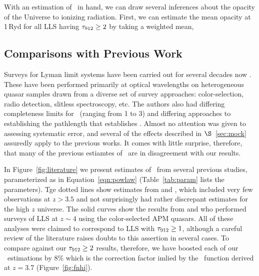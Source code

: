 \documentclass[12pt,preprint]{aastex}
\begin{document}
With an estimation of \lfnhi\ in hand, we can draw several inferences
about the opacity of the Universe to ionizing radiation.  First,
we can estimate the mean opacity at 1\,Ryd for all LLS having $\tau_{\rm 912} \ge 2$
by taking a weighted mean,


\subsection{Comparisons with Previous Work}

Surveys for Lyman limit systems have been carried out for several
decades now \citep{tytler84,ssb89,lzt93,sl95,sl96,peroux03}.
These have been  performed primarily at optical wavelengths on 
heterogeneous quasar samples drawn from a diverse set of
survey approaches: color-selection, radio detection, slitless
spectroscopy, etc.  The authors also had differing completeness
limits for \tll\ (ranging from 1 to 3) and differing approaches
to establishing the pathlength that establishes \lzlls.  Almost
no attention was given to assessing systematic error, and several
of the effects described in $\S$~\ref{sec:mock} assuredly apply
to the previous works.  It comes with little surprise, therefore,
that many of the previous estiamtes of \lzlls\ are in disagreement
with our results.

In Figure~\ref{fig:literature} we present estimates of \lzlls\
from several previous studies, parameterized as in Equation~\ref{eqn:powlaw}
(Table~\ref{tab:param} lists the parameters).  
Tge dotted lines show estimates from \cite{ssb89} and \cite{lzt91},
which included very few observations at $z>3.5$ and not surprisingly 
had rather discrepant estimates for the high $z$ universe.
The solid curves show the results from \cite{sl94} and \cite{peroux03}
who performed surveys of LLS at $z \sim 4$ using the color-selected
APM quasars.  All of these analyses were claimed to correspond to 
LLS with $\tau_{\rm 912} \ge 1$, although a careful review of the literature
raises doubts to this assertion in several cases.  To compare against
our $\tau_{\rm 912} \ge 2$ results, therefore, we have boosted each of
our \lzlls\ estimations by $8\%$ which is the correction factor
imlied by the \fnhi\ function derived at $z = 3.7$ (Figure~\ref{fig:fnhi}).
\end{document}
